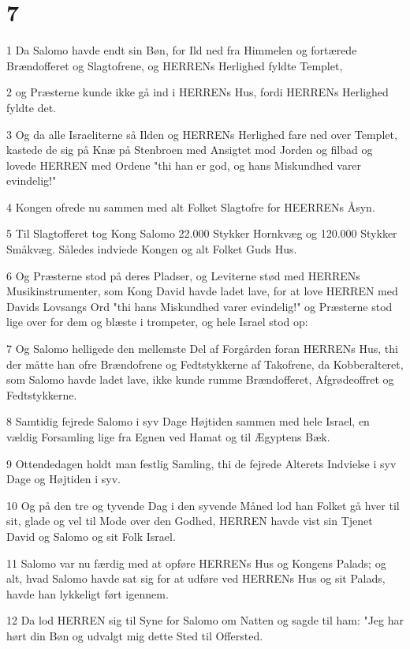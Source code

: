 \chapter{7}

\par 1 Da Salomo havde endt sin Bøn, for Ild ned fra Himmelen og fortærede Brændofferet og Slagtofrene, og HERRENs Herlighed fyldte Templet,
\par 2 og Præsterne kunde ikke gå ind i HERRENs Hus, fordi HERRENs Herlighed fyldte det.
\par 3 Og da alle Israeliterne så Ilden og HERRENs Herlighed fare ned over Templet, kastede de sig på Knæ på Stenbroen med Ansigtet mod Jorden og filbad og lovede HERREN med Ordene "thi han er god, og hans Miskundhed varer evindelig!"
\par 4 Kongen ofrede nu sammen med alt Folket Slagtofre for HEERRENs Åsyn.
\par 5 Til Slagtofferet tog Kong Salomo 22.000 Stykker Hornkvæg og 120.000 Stykker Småkvæg. Således indviede Kongen og alt Folket Guds Hus.
\par 6 Og Præsterne stod på deres Pladser, og Leviterne stød med HERRENs Musikinstrumenter, som Kong David havde ladet lave, for at love HERREN med Davids Lovsangs Ord "thi hans Miskundhed varer evindelig!" og Præsterne stod lige over for dem og blæste i trompeter, og hele Israel stod op:
\par 7 Og Salomo helligede den mellemste Del af Forgården foran HERRENs Hus, thi der måtte han ofre Brændofrene og Fedtstykkerne af Takofrene, da Kobberalteret, som Salomo havde ladet lave, ikke kunde rumme Brændofferet, Afgrødeoffret og Fedtstykkerne.
\par 8 Samtidig fejrede Salomo i syv Dage Højtiden sammen med hele Israel, en vældig Forsamling lige fra Egnen ved Hamat og til Ægyptens Bæk.
\par 9 Ottendedagen holdt man festlig Samling, thi de fejrede Alterets Indvielse i syv Dage og Højtiden i syv.
\par 10 Og på den tre og tyvende Dag i den syvende Måned lod han Folket gå hver til sit, glade og vel til Mode over den Godhed, HERREN havde vist sin Tjenet David og Salomo og sit Folk Israel.
\par 11 Salomo var nu færdig med at opføre HERRENs Hus og Kongens Palads; og alt, hvad Salomo havde sat sig for at udføre ved HERRENs Hus og sit Palads, havde han lykkeligt ført igennem.
\par 12 Da lod HERREN sig til Syne for Salomo om Natten og sagde til ham: "Jeg har hørt din Bøn og udvalgt mig dette Sted til Offersted.
